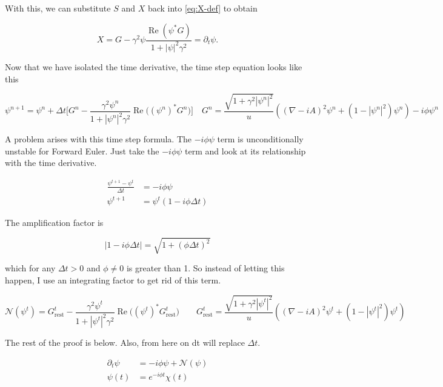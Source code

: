 \documentclass[11pt]{article}
\theoremstyle{definition}
\renewcommand{\Re}{\operatorname{Re}}
\begin{document}
With this, we can substitute $S$ and $X$ back into \cref{eq:X-def} to obtain

\begin{equation}
\label{eq:X-result}
X = G - \gamma^2 \psi \frac{\Re(\psi^* G)}{1 + |\psi|^2 \gamma^2} = \partial_t \psi.
\end{equation}

Now that we have isolated the time derivative, the time step equation looks like this

\begin{equation}
\label{eq:psi-timestep-naive}
\psi^{n+1} = \psi^n + \Delta t \Big[ G^n - \frac{\gamma^2 \psi^n}{1 + |\psi^n|^2 \gamma^2} \Re\big( (\psi^n)^* G^n \big) \Big] \quad G^n = \frac{\sqrt{1 + \gamma^2 |\psi^n|^2}}{u} \left( (\nabla - iA)^2 \psi^n + (1 - |\psi^n|^2) \psi^n \right) - i \phi \psi^n
\end{equation}

A problem arises with this time step formula. The $-i \phi \psi$ term is unconditionally unstable for Forward Euler. Just take the $- i \phi \psi$ term and look at its relationship with the time derivative.

\begin{align}
\frac{\psi^{t+1} - \psi^t}{\Delta t} &= -i \phi \psi \label{eq:phi-instab}\\
\psi^{t+1} &= \psi^t (1 - i \phi \Delta t) \label{eq:phi-amp}
\end{align}

The amplification factor is

\begin{equation}
\label{eq:amp-factor}
|1 - i \phi \Delta t| = \sqrt{1 + (\phi \Delta t)^2}
\end{equation}

which for any $\Delta t > 0$ and $\phi \neq 0$ is greater than 1.
So instead of letting this happen, I use an integrating factor to get rid of this term.

\begin{equation}
\label{eq:N-def}
\mathcal{N}(\psi^t) = G_{\mathrm{rest}}^t - \frac{\gamma^2 \psi^t}{1 + |\psi^t|^2 \gamma^2} \Re\big( (\psi^t)^* G_{\mathrm{rest}}^t \big) \qquad G_{\mathrm{rest}}^t = \frac{\sqrt{1 + \gamma^2 |\psi^t|^2}}{u} \left( (\nabla - iA)^2 \psi^t + (1 - |\psi^t|^2) \psi^t \right)
\end{equation}

The rest of the proof is below. Also, from here on dt will replace $\Delta t$.

\begin{align}
\partial_t \psi &= -i \phi \psi + \mathcal{N}(\psi) \label{eq:dpsi-split}\\
\psi(t) &= e^{-i \phi t} \chi(t) \label{eq:chi-sub}
\end{align}
\end{document}
